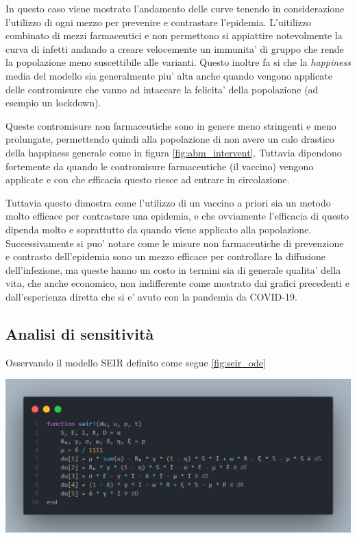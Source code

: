 In questo caso viene mostrato l'andamento delle curve tenendo in considerazione l'utilizzo di ogni mezzo
per prevenire e contrastare l'epidemia. L'uitilizzo combinato di mezzi farmaceutici e non permettono 
si appiattire notevolmente la curva di infetti andando a creare velocemente un immunita' di gruppo 
che rende la popolazione meno suscettibile alle varianti. Questo inoltre fa si che la \emph{happiness} media
del modello sia generalmente piu' alta anche quando vengono applicate delle contromisure che vanno ad 
intaccare la felicita' della popolazione (ad esempio un lockdown). 

Queste contromisure non farmaceutiche sono in genere meno stringenti e meno prolungate, permettendo quindi
alla popolazione di non avere un calo drastico della happiness generale come in figura \ref{fig:abm_intervent}.
Tuttavia dipendono fortemente da quando le contromisure farmaceutiche (il vaccino) vengono applicate
e con che efficacia questo riesce ad entrare in circolazione. 

Tuttavia questo dimostra come l'utilizzo di un vaccino a priori sia un metodo molto efficace per contrastare
una epidemia, e che ovviamente l'efficacia di questo dipenda molto e soprattutto da quando viene applicato 
alla popolazione. Successivamente si puo' notare come le misure non farmaceutiche di prevenzione e contrasto
dell'epidemia sono un mezzo efficace per controllare la diffusione dell'infezione, ma queste hanno un costo 
in termini sia di generale qualita' della vita, che anche economico, non indifferente come mostrato dai grafici 
precedenti e dall'esperienza diretta che si e' avuto con la pandemia da COVID-19. 

\subsection{Analisi di sensitività}
Osservando il modello SEIR definito come segue \ref{fig:seir_ode}

\begin{minipage}{\linewidth}
	\centering
	\includegraphics[width=\textwidth]{img/seir_ode.png}
	\label{fig:seir_ode}
\end{minipage}

